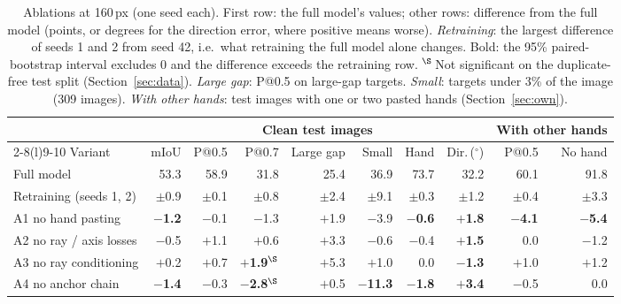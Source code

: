 \begin{table}[t]
  \caption{Ablations at 160\,px (one seed each). First row: the full model's values; other rows: difference from the full model (points, or degrees for the direction error, where positive means worse). \emph{Retraining}: the largest difference of seeds 1 and 2 from seed 42, i.e.\ what retraining the full model alone changes. Bold: the 95\% paired-bootstrap interval excludes 0 and the difference exceeds the retraining row. $^\S$\,Not significant on the duplicate-free test split (Section~\ref{sec:data}). \emph{Large gap}: P@0.5 on large-gap targets. \emph{Small}: targets under 3\% of the image (309 images). \emph{With other hands}: test images with one or two pasted hands (Section~\ref{sec:own}).}
  \label{tab:ablation}
  \footnotesize
  \setlength{\tabcolsep}{3pt}
  \begin{tabular}{lrrrrrrrrr}
    \toprule
    & \multicolumn{7}{c}{Clean test images} & \multicolumn{2}{c}{With other hands} \\
    \cmidrule(lr){2-8}\cmidrule(l){9-10}
    Variant & mIoU & P@0.5 & P@0.7 & Large gap & Small & Hand & Dir.\,($^\circ$) & P@0.5 & No hand \\
    \midrule
    Full model & 53.3 & 58.9 & 31.8 & 25.4 & 36.9 & 73.7 & 32.2 & 60.1 & 91.8 \\
    \quad Retraining (seeds 1, 2) & $\pm$0.9 & $\pm$0.1 & $\pm$0.8 & $\pm$2.4 & $\pm$9.1 & $\pm$0.3 & $\pm$1.2 & $\pm$0.4 & $\pm$3.3 \\
    \midrule
    A1 no hand pasting & \textbf{$-$1.2} & $-$0.1 & $-$1.3 & $+$1.9 & $-$3.9 & \textbf{$-$0.6} & \textbf{$+$1.8} & \textbf{$-$4.1} & \textbf{$-$5.4} \\
    A2 no ray / axis losses & $-$0.5 & $+$1.1 & $+$0.6 & $+$3.3 & $-$0.6 & $-$0.4 & \textbf{$+$1.5} & 0.0 & $-$1.2 \\
    A3 no ray conditioning & $+$0.2 & $+$0.7 & \textbf{$+$1.9}$^\S$ & $+$5.3 & $+$1.0 & 0.0 & \textbf{$-$1.3} & $+$1.0 & $+$1.2 \\
    A4 no anchor chain & \textbf{$-$1.4} & $-$0.3 & \textbf{$-$2.8}$^\S$ & $+$0.5 & \textbf{$-$11.3} & \textbf{$-$1.8} & \textbf{$+$3.4} & $-$0.5 & 0.0 \\
    \bottomrule
  \end{tabular}
\end{table}

